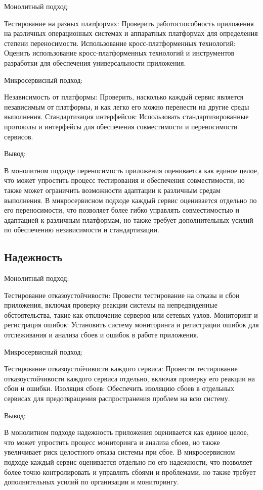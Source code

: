 Монолитный подход:

    Тестирование на разных платформах: Проверить работоспособность приложения на различных операционных системах и аппаратных платформах для определения степени переносимости.
    Использование кросс-платформенных технологий: Оценить использование кросс-платформенных технологий и инструментов разработки для обеспечения универсальности приложения.

Микросервисный подход:

    Независимость от платформы: Проверить, насколько каждый сервис является независимым от платформы, и как легко его можно перенести на другие среды выполнения.
    Стандартизация интерфейсов: Использовать стандартизированные протоколы и интерфейсы для обеспечения совместимости и переносимости сервисов.

Вывод:

    В монолитном подходе переносимость приложения оценивается как единое целое, что может упростить процесс тестирования и обеспечения совместимости, но также может ограничить возможности адаптации к различным средам выполнения.
    В микросервисном подходе каждый сервис оценивается отдельно по его переносимости, что позволяет более гибко управлять совместимостью и адаптацией к различным платформам, но также требует дополнительных усилий по обеспечению независимости и стандартизации.

\subsection{Надежность}

Монолитный подход:

    Тестирование отказоустойчивости: Провести тестирование на отказы и сбои приложения, включая проверку реакции системы на непредвиденные обстоятельства, такие как отключение серверов или сетевых узлов.
    Мониторинг и регистрация ошибок: Установить систему мониторинга и регистрации ошибок для отслеживания и анализа сбоев и ошибок в работе приложения.

Микросервисный подход:

    Тестирование отказоустойчивости каждого сервиса: Провести тестирование отказоустойчивости каждого сервиса отдельно, включая проверку его реакции на сбои и ошибки.
    Изоляция сбоев: Обеспечить изоляцию сбоев в отдельных сервисах для предотвращения распространения проблем на всю систему.

Вывод:

    В монолитном подходе надежность приложения оценивается как единое целое, что может упростить процесс мониторинга и анализа сбоев, но также увеличивает риск целостного отказа системы при сбое.
    В микросервисном подходе каждый сервис оценивается отдельно по его надежности, что позволяет более точно контролировать и управлять сбоями и проблемами, но также требует дополнительных усилий по организации и мониторингу.

